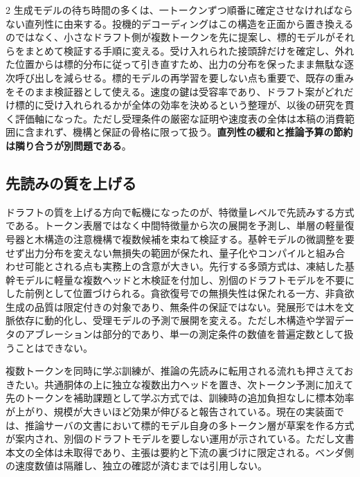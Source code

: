 \documentclass[lualatex,a4paper,10pt]{jlreq}
\begin{document}
\begin{multicols}{2}
\raggedcolumns
生成モデルの待ち時間の多くは、一トークンずつ順番に確定させなければならない直列性に由来する。投機的デコーディングはこの構造を正面から置き換えるのではなく、小さなドラフト側が複数トークンを先に提案し、標的モデルがそれらをまとめて検証する手順に変える\autocite{specdecode,chenspec}。受け入れられた接頭辞だけを確定し、外れた位置からは標的分布に従って引き直すため、出力の分布を保ったまま無駄な逐次呼び出しを減らせる。標的モデルの再学習を要しない点も重要で、既存の重みをそのまま検証器として使える。速度の鍵は受容率であり、ドラフト案がどれだけ標的に受け入れられるかが全体の効率を決めるという整理が、以後の研究を貫く評価軸になった。ただし受理条件の厳密な証明や速度表の全体は本稿の消費範囲に含まれず、機構と保証の骨格に限って扱う。\textbf{直列性の緩和と推論予算の節約は隣り合うが別問題である}。

\subsection{先読みの質を上げる}
ドラフトの質を上げる方向で転機になったのが、特徴量レベルで先読みする方式である\autocite{eagle}。トークン表層ではなく中間特徴量から次の展開を予測し、単層の軽量復号器と木構造の注意機構で複数候補を束ねて検証する。基幹モデルの微調整を要せず出力分布を変えない無損失の範囲が保たれ、量子化やコンパイルと組み合わせ可能とされる点も実務上の含意が大きい。先行する多頭方式は、凍結した基幹モデルに軽量な複数ヘッドと木検証を付加し、別個のドラフトモデルを不要にした前例として位置づけられる\autocite{medusa}。貪欲復号での無損失性は保たれる一方、非貪欲生成の品質は限定付きの対象であり、無条件の保証ではない。発展形では木を文脈依存に動的化し、受理モデルの予測で展開を変える\autocite{eagle2}。ただし木構造や学習データのアブレーションは部分的であり、単一の測定条件の数値を普遍定数として扱うことはできない。

複数トークンを同時に学ぶ訓練が、推論の先読みに転用される流れも押さえておきたい。共通胴体の上に独立な複数出力ヘッドを置き、次トークン予測に加えて先のトークンを補助課題として学ぶ方式では、訓練時の追加負担なしに標本効率が上がり、規模が大きいほど効果が伸びると報告されている\autocite{mtp}。現在の実装面では、推論サーバの文書において標的モデル自身の多トークン層が草案を作る方式が案内され、別個のドラフトモデルを要しない運用が示されている\autocite{vllmmtp}。ただし文書本文の全体は未取得であり、主張は要約と下流の裏づけに限定される。ベンダ側の速度数値は隔離し、独立の確認が済むまでは引用しない。


\end{multicols}
\end{document}
